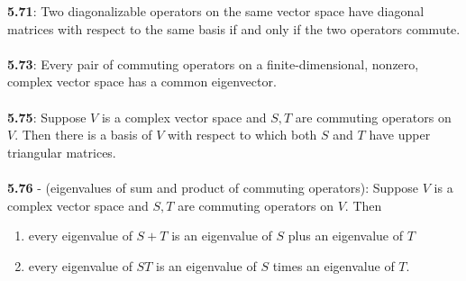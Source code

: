 \documentclass{article}
\theoremstyle{definition}
\begin{document}
\textbf{5.71}: Two diagonalizable operators on the same vector space have diagonal matrices
with respect to the same basis if and only if the two operators commute. \\ \\
\textbf{5.73}: Every pair of commuting operators on a finite-dimensional, nonzero, complex
vector space has a common eigenvector. \\ \\
\textbf{5.75}: Suppose $V$ is a complex vector space and $S, T$ are commuting operators on $V$. Then there is a basis of $V$ with respect to which both $S$ and $T$ have upper triangular matrices. \\ \\
\textbf{5.76} - (eigenvalues of sum and product of commuting operators): Suppose $V$ is a complex vector space and $S, T$ are commuting operators on $V$. Then \begin{enumerate}
    \item every eigenvalue of $S + T$ is an eigenvalue of $S$ plus an eigenvalue of $T$
    \item every eigenvalue of $ST$ is an eigenvalue of $S$ times an eigenvalue of $T$.
\end{enumerate}
\end{document}
